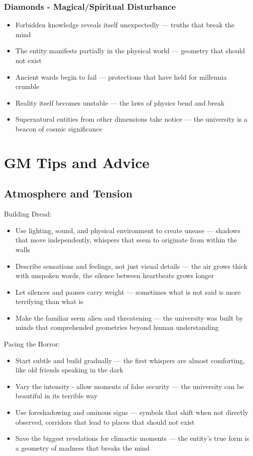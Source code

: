 \documentclass[11pt]{article}
\begin{document}
\subsubsection{Diamonds - Magical/Spiritual Disturbance}

\begin{itemize}
\item Forbidden knowledge reveals itself unexpectedly --- truths that break the mind
\item The entity manifests partially in the physical world --- geometry that should not exist
\item Ancient wards begin to fail --- protections that have held for millennia crumble
\item Reality itself becomes unstable --- the laws of physics bend and break
\item Supernatural entities from other dimensions take notice --- the university is a beacon of cosmic significance
\end{itemize}

\section{GM Tips and Advice}

\subsection{Atmosphere and Tension}

Building Dread:
\begin{itemize}
\item Use lighting, sound, and physical environment to create unease --- shadows that move independently, whispers that seem to originate from within the walls
\item Describe sensations and feelings, not just visual details --- the air grows thick with unspoken words, the silence between heartbeats grows longer
\item Let silences and pauses carry weight --- sometimes what is not said is more terrifying than what is
\item Make the familiar seem alien and threatening --- the university was built by minds that comprehended geometries beyond human understanding
\end{itemize}

Pacing the Horror:
\begin{itemize}
\item Start subtle and build gradually --- the first whispers are almost comforting, like old friends speaking in the dark
\item Vary the intensity - allow moments of false security --- the university can be beautiful in its terrible way
\item Use foreshadowing and ominous signs --- symbols that shift when not directly observed, corridors that lead to places that should not exist
\item Save the biggest revelations for climactic moments --- the entity's true form is a geometry of madness that breaks the mind
\end{itemize}
\end{document}

